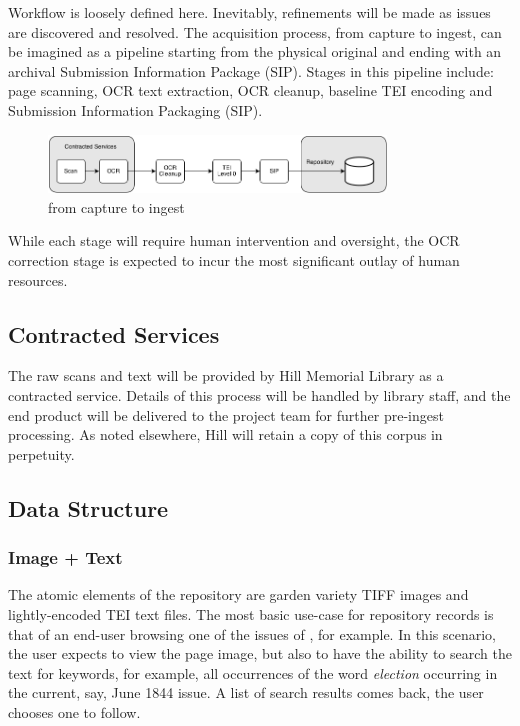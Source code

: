 Workflow is loosely defined here. Inevitably, refinements will be made as issues are discovered and resolved. The acquisition process, from capture to ingest, can be imagined as a pipeline starting from the physical original and ending with an archival Submission Information Package (SIP). Stages in this pipeline include: page scanning, OCR text extraction, OCR cleanup, baseline TEI encoding and Submission Information Packaging (SIP).
\begin{figure}[H]
  \includegraphics[width=0.8\textwidth]{sip-pipeline.png}
  \caption{from capture to ingest}
\end{figure}
While each stage will require human intervention and oversight, the OCR correction stage is expected to incur the most significant outlay of human resources. 
\subsection{Contracted Services}
The raw scans and text will be provided by Hill Memorial Library as a contracted service. Details of this process will be handled by library staff, and the end product will be delivered to the project team for further pre-ingest processing. As noted elsewhere, Hill will retain a copy of this corpus in perpetuity.

\subsection{Data Structure}
\subsubsection{Image + Text}
The atomic elements of the repository are garden variety TIFF images and lightly-encoded\cite{tei_sig_on_libraries_best_2011} TEI text files. The most basic use-case for repository records is that of an end-user browsing one of the issues of \bwj{}, for example. In this scenario, the user expects to view the page image, but also to have the ability to search the text for keywords, for example, all occurrences of the word \emph{election} occurring in the current, say, June 1844 issue. A list of search results comes back, the user chooses one to follow.

